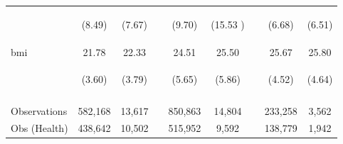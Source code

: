 \documentclass{article}[11pt,subeqn]
\begin{document}
\begin{spacing}{1.5}
\begin{table}[ht]
\begin{center}
\begin{tabular}{lccp{5mm}ccp{5mm}cc}
\begin{footnotesize}\end{footnotesize}	& \begin{footnotesize} (8.49)\end{footnotesize} & \begin{footnotesize} (7.67)\end{footnotesize} & \begin{footnotesize} 	\end{footnotesize} & \begin{footnotesize} (9.70)\end{footnotesize} & \begin{footnotesize} (15.53	)\end{footnotesize} & \begin{footnotesize} 	\end{footnotesize} & \begin{footnotesize} (6.68)\end{footnotesize} & \begin{footnotesize} (6.51)\end{footnotesize}	\\
bmi	&	21.78	&	22.33	&	&	24.51	&	25.50	&	&	25.67	&	25.80		\\
\begin{footnotesize}\end{footnotesize}	& \begin{footnotesize} (3.60)\end{footnotesize} & \begin{footnotesize} (3.79)\end{footnotesize} & \begin{footnotesize} 	\end{footnotesize} & \begin{footnotesize} (5.65)\end{footnotesize} & \begin{footnotesize} (5.86)\end{footnotesize} & \begin{footnotesize} 	\end{footnotesize} & \begin{footnotesize} (4.52)\end{footnotesize} & \begin{footnotesize} (4.64)\end{footnotesize}	\\
\\ \midrule																
Observations & 582,168 & 13,617 & & 850,863 & 14,804 & & 233,258 & 3,562 \\ 
Obs (Health) & 438,642 & 10,502 & & 515,952 & 9,592 & & 138,779 & 1,942 \\ 
\bottomrule																



\end{tabular}
\end{center}
\end{table}
\end{spacing}
\end{document}
